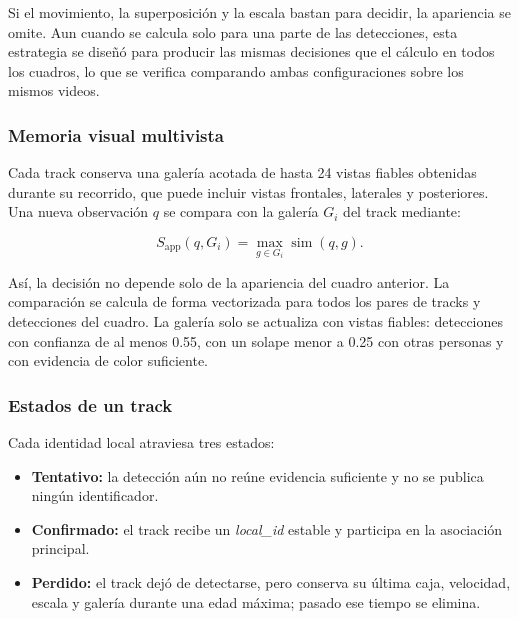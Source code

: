 \documentclass[12pt,letterpaper]{article}
\begin{document}
Si el movimiento, la superposición y la escala bastan para decidir, la
apariencia se omite. Aun cuando se calcula solo para una parte de las
detecciones, esta estrategia se diseñó para producir las mismas
decisiones que el cálculo en todos los cuadros, lo que se verifica
comparando ambas configuraciones sobre los mismos videos.

\subsubsection{Memoria visual multivista}

Cada track conserva una galería acotada de hasta 24 vistas fiables
obtenidas durante su recorrido, que puede incluir vistas frontales,
laterales y posteriores. Una nueva observación $q$ se compara con la
galería $G_i$ del track mediante:

\begin{equation}
S_{\text{app}}(q,G_i)=
\max_{g \in G_i}
\operatorname{sim}(q,g).
\end{equation}

Así, la decisión no depende solo de la apariencia del cuadro anterior. La
comparación se calcula de forma vectorizada para todos los pares de
tracks y detecciones del cuadro. La galería solo se actualiza con vistas
fiables: detecciones con confianza de al menos 0.55, con un solape menor
a 0.25 con otras personas y con evidencia de color suficiente.

\subsubsection{Estados de un track}

Cada identidad local atraviesa tres estados:

\begin{itemize}
    \item \textbf{Tentativo:} la detección aún no reúne evidencia
    suficiente y no se publica ningún identificador.
    \item \textbf{Confirmado:} el track recibe un \textit{local\_id}
    estable y participa en la asociación principal.
    \item \textbf{Perdido:} el track dejó de detectarse, pero conserva su
    última caja, velocidad, escala y galería durante una edad máxima;
    pasado ese tiempo se elimina.
\end{itemize}
\end{document}

